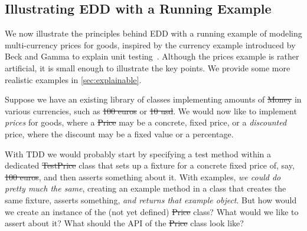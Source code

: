 \documentclass[acmsmall,screen,authorversion,nonacm]{acmart} %
\begin{document}

\subsection{Illustrating EDD with a Running Example}

We now illustrate the principles behind EDD with a running example of modeling multi-currency prices for goods, inspired by the currency example introduced by Beck and Gamma to explain unit testing~\cite{Beck98a}.
Although the prices example is rather artificial, it is small enough to illustrate the key points.
We provide some more realistic examples in \autoref{sec:explainable}.

%

Suppose we have an existing library of classes implementing amounts of \st{Money} in various currencies, such as \st{100 euros} or \st{10 usd}.
We would now like to implement \emph{prices} for goods, where a \st{Price} may be a concrete, fixed price, or a \emph{discounted} price, where the discount may be a fixed value or a percentage.

With TDD we would probably start by specifying a test method within a dedicated \st{TestPrice} class that sets up a fixture for a concrete fixed price of, say, \st{100 euros}, and then asserts something about it.
With examples, \emph{we could do pretty much the same}, creating an example method in a  class that creates the same fixture, asserts something, \emph{and returns that example object}.
But how would we create an instance of the (not yet defined) \st{Price} class?
What would we like to assert about it?
What should the API of the \st{Price} class look like?
\end{document}
